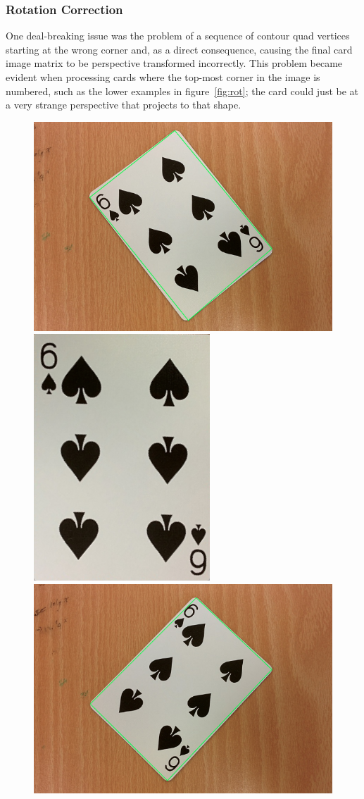 \documentclass[a4paper,12pt,notitlepage]{article}
\begin{document}
		\subsubsection{Rotation Correction}
			One deal-breaking issue was the problem of a sequence of contour quad vertices starting at the wrong corner and, as a direct consequence, causing the final card image matrix to be perspective transformed incorrectly. This problem became evident when processing cards where the top-most corner in the image is numbered, such as the lower examples in figure~\ref{fig:rot}; the card could just be at a very strange perspective that projects to that shape.

			\begin{figure}[H]
				\centering
				\includegraphics[width=0.6\linewidth]{rot1}
				\includegraphics[width=0.3\linewidth]{rot2}\\[5px]
				\includegraphics[width=0.6\linewidth]{rot3}

\end{figure}
\end{document}
